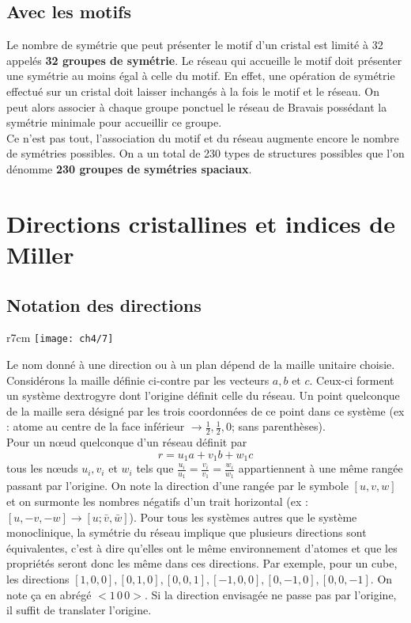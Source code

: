 	\subsection{Avec les motifs}
		Le nombre de symétrie que peut présenter le motif d'un cristal est limité à 32 appelés \textbf{32 groupes de symétrie}. Le réseau qui accueille le motif doit présenter une symétrie au moins égal à celle du motif. En effet, une opération de symétrie effectué sur un cristal doit laisser inchangés à la fois le motif et le réseau. On peut alors associer à chaque groupe ponctuel le réseau de Bravais possédant la symétrie minimale pour accueillir ce groupe. \\ Ce n'est pas tout, l'association du motif et du réseau augmente encore le nombre de symétries possibles. On a un total de 230 types de structures possibles que l'on dénomme \textbf{230 groupes de symétries spaciaux}. 
		
	
\section{Directions cristallines et indices de Miller}
	\subsection{Notation des directions}
		\begin{wrapfigure}[10]{r}{7cm}
		\vspace{-10mm}
		\texttt{[image: ch4/7]}
		\end{wrapfigure}	
		Le nom donné à une direction ou à un plan dépend de la maille unitaire choisie. Considérons la maille définie ci-contre par les vecteurs $a,b$ et $c$. Ceux-ci forment un système dextrogyre dont l'origine définit celle du réseau. Un point quelconque de la maille sera désigné par les trois coordonnées de ce point dans ce système (ex : atome au centre de la face inférieur $\rightarrow \frac{1}{2},\frac{1}{2},0$; sans parenthèses). \\
		Pour un nœud quelconque d'un réseau définit par
		\begin{equation}
			r = u_1 a + v_1b+w_1c
		\end{equation}
		tous les nœuds $u_i,v_i$ et $w_i$ tels que $\frac{u_i}{u_1} = \frac{v_i}{v_1} = \frac{w_i}{w_1}$ appartiennent à une même rangée passant par l'origine. On note la direction d'une rangée par le symbole $[u,v,w]$ et on surmonte les nombres négatifs d'un trait horizontal (ex : $[u,-v,-w] \rightarrow [u;\bar{v},\bar{w}]$). Pour tous les systèmes autres que le système monoclinique, la symétrie du réseau implique que plusieurs directions sont équivalentes, c'est à dire qu'elles ont le même environnement d'atomes et que les propriétés seront donc les même dans ces directions. Par exemple, pour un cube, les directions $[1,0,0],[0,1,0],[0,0,1],[-1,0,0],[0,-1,0],[0,0,-1]$. On note ça en abrégé $<1\, 0 \, 0>$. Si la direction envisagée ne passe pas par l'origine, il suffit de translater l'origine.
		
